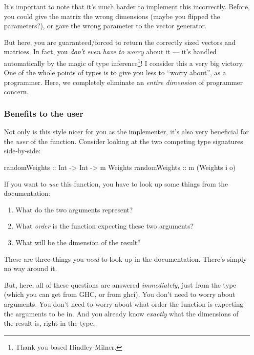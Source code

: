 \documentclass[]{article}
\newenvironment{Shaded}{}{}
\newcommand{\DataTypeTok}[1]{\textcolor[rgb]{0.56,0.13,0.00}{#1}}
\newcommand{\NormalTok}[1]{#1}
\newcommand{\OtherTok}[1]{\textcolor[rgb]{0.00,0.44,0.13}{#1}}
\begin{document}
It's important to note that it's much harder to implement this incorrectly.
Before, you could give the matrix the wrong dimensions (maybe you flipped the
parameters?), or gave the wrong parameter to the vector generator.

But here, you are guaranteed/forced to return the correctly sized vectors and
matrices. In fact, you \emph{don't even have to worry} about it --- it's handled
automatically by the magic of type inference\footnote{Thank you based
  Hindley-Milner.}! I consider this a very big victory. One of the whole points
of types is to give you less to ``worry about'', as a programmer. Here, we
completely eliminate an \emph{entire dimension} of programmer concern.

\subsubsection{Benefits to the user}\label{benefits-to-the-user}

Not only is this style nicer for you as the implementer, it's also very
beneficial for the \emph{user} of the function. Consider looking at the two
competing type signatures side-by-side:

\begin{Shaded}
\begin{Highlighting}[]
\OtherTok{randomWeights ::} \DataTypeTok{Int} \OtherTok{{-}\textgreater{}} \DataTypeTok{Int} \OtherTok{{-}\textgreater{}}\NormalTok{ m }\DataTypeTok{Weights}
\OtherTok{randomWeights ::}\NormalTok{               m (}\DataTypeTok{Weights}\NormalTok{ i o)}
\end{Highlighting}
\end{Shaded}

If you want to \emph{use} this function, you have to look up some things from
the documentation:

\begin{enumerate}
\def\labelenumi{\arabic{enumi}.}
\tightlist
\item
  What do the two arguments represent?
\item
  What \emph{order} is the function expecting these two arguments?
\item
  What will be the dimension of the result?
\end{enumerate}

These are three things you \emph{need} to look up in the documentation. There's
simply no way around it.

But, here, all of these questions are answered \emph{immediately}, just from the
type (which you can get from GHC, or from ghci). You don't need to worry about
arguments. You don't need to worry about what order the function is expecting
the arguments to be in. And you already know \emph{exactly} what the dimensions
of the result is, right in the type.
\end{document}
